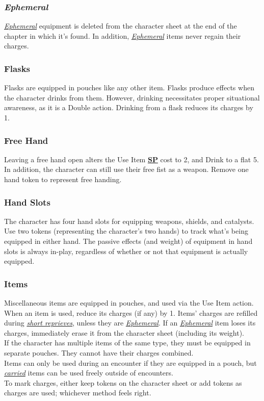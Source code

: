 \documentclass[12pt]{article}
\newcommand{\refto}[1]{\hyperlink{#1}{\textbf{#1}}}
\newcommand{\reftoit}[1]{\hyperlink{#1}{\emph{#1}}}
\begin{document}
\begin{multicols*}{2}
\subsubsection{\emph{Ephemeral}}
\hypertarget{Ephemeral}{}
\reftoit{Ephemeral} equipment is deleted from the character sheet at the end of the chapter in which it’s found. In addition, \reftoit{Ephemeral} items never regain their charges.

\subsubsection{Flasks}
Flasks are equipped in pouches like any other item. Flasks produce effects when the character drinks from them. However, drinking necessitates proper situational awareness, as it is a Double action. Drinking from a flask reduces its charges by 1.

\subsubsection{Free Hand}
Leaving a free hand open alters the Use Item \refto{SP} cost to 2, and Drink to a flat 5. In addition, the character can still use their free fist as a weapon. Remove one hand token to represent free handing.

\subsubsection{Hand Slots}
The character has four hand slots for equipping weapons, shields, and catalysts. Use two tokens (representing the character’s two hands) to track what’s being equipped in either hand. The passive effects (and weight) of equipment in hand slots is always in-play, regardless of whether or not that equipment is actually equipped.

\subsubsection{Items}
Miscellaneous items are equipped in pouches, and used via the Use Item action. When an item is used, reduce its charges (if any) by 1. Items’ charges are refilled during \reftoit{short reprieves}, unless they are \reftoit{Ephemeral}. If an \reftoit{Ephemeral} item loses its charges, immediately erase it from the character sheet (including its weight).\\
If the character has multiple items of the same type, they must be equipped in separate pouches. They cannot have their charges combined.\\
Items can only be used during an encounter if they are equipped in a pouch, but \reftoit{carried} items can be used freely outside of encounters.\\
To mark charges, either keep tokens on the character sheet or add tokens as charges are used; whichever method feels right.


\end{multicols*}
\end{document}
